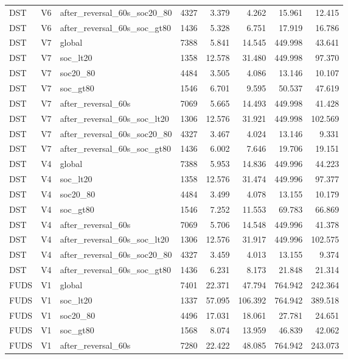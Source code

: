 \begin{tabular}{lllrrrrr}
DST & V6 & after\_reversal\_60s\_soc20\_80 & 4327 & 3.379 & 4.262 & 15.961 & 12.415 \\
DST & V6 & after\_reversal\_60s\_soc\_gt80 & 1436 & 5.328 & 6.751 & 17.919 & 16.786 \\
DST & V7 & global & 7388 & 5.841 & 14.545 & 449.998 & 43.641 \\
DST & V7 & soc\_lt20 & 1358 & 12.578 & 31.480 & 449.998 & 97.370 \\
DST & V7 & soc20\_80 & 4484 & 3.505 & 4.086 & 13.146 & 10.107 \\
DST & V7 & soc\_gt80 & 1546 & 6.701 & 9.595 & 50.537 & 47.619 \\
DST & V7 & after\_reversal\_60s & 7069 & 5.665 & 14.493 & 449.998 & 41.428 \\
DST & V7 & after\_reversal\_60s\_soc\_lt20 & 1306 & 12.576 & 31.921 & 449.998 & 102.569 \\
DST & V7 & after\_reversal\_60s\_soc20\_80 & 4327 & 3.467 & 4.024 & 13.146 & 9.331 \\
DST & V7 & after\_reversal\_60s\_soc\_gt80 & 1436 & 6.002 & 7.646 & 19.706 & 19.151 \\
DST & V4 & global & 7388 & 5.953 & 14.836 & 449.996 & 44.223 \\
DST & V4 & soc\_lt20 & 1358 & 12.576 & 31.474 & 449.996 & 97.377 \\
DST & V4 & soc20\_80 & 4484 & 3.499 & 4.078 & 13.155 & 10.179 \\
DST & V4 & soc\_gt80 & 1546 & 7.252 & 11.553 & 69.783 & 66.869 \\
DST & V4 & after\_reversal\_60s & 7069 & 5.706 & 14.548 & 449.996 & 41.378 \\
DST & V4 & after\_reversal\_60s\_soc\_lt20 & 1306 & 12.576 & 31.917 & 449.996 & 102.575 \\
DST & V4 & after\_reversal\_60s\_soc20\_80 & 4327 & 3.459 & 4.013 & 13.155 & 9.374 \\
DST & V4 & after\_reversal\_60s\_soc\_gt80 & 1436 & 6.231 & 8.173 & 21.848 & 21.314 \\
FUDS & V1 & global & 7401 & 22.371 & 47.794 & 764.942 & 242.364 \\
FUDS & V1 & soc\_lt20 & 1337 & 57.095 & 106.392 & 764.942 & 389.518 \\
FUDS & V1 & soc20\_80 & 4496 & 17.031 & 18.061 & 27.781 & 24.651 \\
FUDS & V1 & soc\_gt80 & 1568 & 8.074 & 13.959 & 46.839 & 42.062 \\
FUDS & V1 & after\_reversal\_60s & 7280 & 22.422 & 48.085 & 764.942 & 243.073 \\

\end{tabular}
